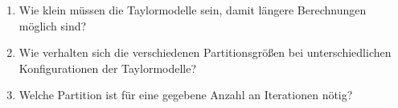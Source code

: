 \begin{enumerate}
 \item Wie klein müssen die Taylormodelle sein, damit längere Berechnungen möglich sind?
 \item Wie verhalten sich die verschiedenen Partitionsgrößen bei unterschiedlichen Konfigurationen der Taylormodelle?
 \item Welche Partition ist für eine gegebene Anzahl an Iterationen nötig?
\end{enumerate}




